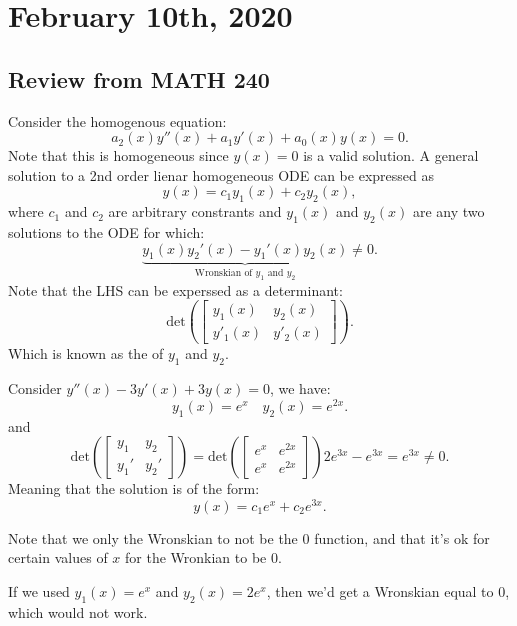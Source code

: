 \documentclass[../main/main.tex]{subfiles}
\begin{document}
\section{February 10th, 2020}
\subsection{Review from MATH 240}
Consider the homogenous equation: \[
	a_2(x)y''(x) + a_1y'(x)+a_0(x)y(x)=0
.\] Note that this is homogeneous since $y(x) = 0$ is a valid solution. A general solution to a 2nd order lienar homogeneous ODE can be expressed as \[
y(x) = c_1y_1(x) + c_2y_2(x)
,\]  where $c_1$ and $c_2$ are arbitrary constrants and $y_1(x)$ and $y_2(x)$ are any two solutions to the ODE for which: \[
\underbrace{y_1(x) y_2'(x)-y_1'(x)y_2(x)}_{\text{Wronskian of $y_1$ and $y_2$}}\neq 0
.\] Note that the LHS can be experssed as a determinant: \[
\text{det}\left(\begin{bmatrix} y_1(x)&y_2(x)\\y'_1(x)&y'_2(x) \end{bmatrix} \right)
.\] Which is known as the  of $y_1$ and $y_2$.
\begin{example} \label{coneq}
	Consider $y''(x)-3y'(x)+3y(x)=0$, we have:  \[
		y_1(x)=e^{x}\quad y_2(x) = e^{2x}
	.\] and \[
	\text{det}\left( \begin{bmatrix} y_1&y_2\\y_1'&y_2' \end{bmatrix}  \right) = \text{det}\left( \begin{bmatrix} e^{x}&e^{2x}\\e^{x}&e^{2x} \end{bmatrix}  \right)  2e^{3x}-e^{3x}=e^{3x}\neq 0
	.\] Meaning that the solution is of the form: \[
	y(x) = c_1e^{x}+c_2e^{3x}
	.\] 
\end{example}
\begin{remark}
	Note that we only the Wronskian to not be the 0 function, and that it's ok for certain values of $x$ for the Wronkian to be 0.
\end{remark}
\begin{example}
	If we used $y_1(x)=e^{x}$ and $y_2(x)=2e^{x}$, then we'd get a Wronskian equal to 0, which would not work.
\end{example}
\end{document}
